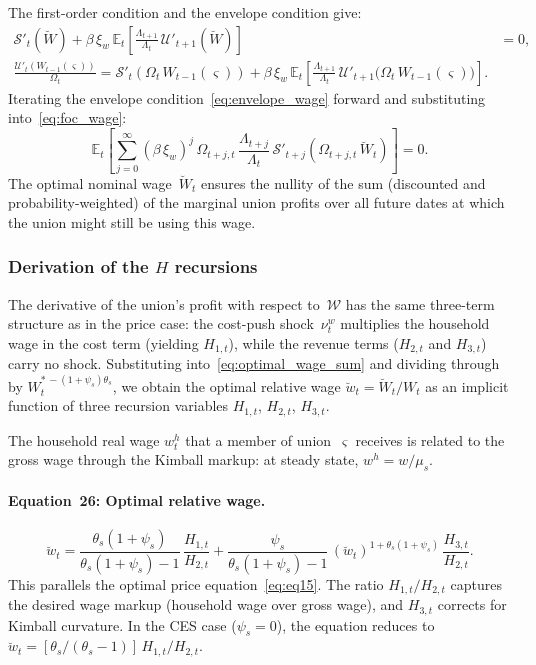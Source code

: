 \documentclass[11pt,a4paper]{article}
\newcommand{\E}{\mathbb{E}}
\begin{document}
The first-order condition and the envelope condition give:
\begin{align}
  \mathscr{S}'_t(\breve W) + \beta\,\xi_w\,\E_t\!\left[
    \frac{\Lambda_{t+1}}{\Lambda_t}\,\mathcal{U}'_{t+1}(\breve W)\right]
  &= 0, \label{eq:foc_wage}\\[4pt]
  \frac{\mathcal{U}'_t(W_{t-1}(\varsigma))}{\Omega_t}
  = \mathscr{S}'_t\!\left(\Omega_t\,W_{t-1}(\varsigma)\right)
  + \beta\,\xi_w\,\E_t\!\left[
    \frac{\Lambda_{t+1}}{\Lambda_t}\,
    \mathcal{U}'_{t+1}\bigl(\Omega_t\,W_{t-1}(\varsigma)\bigr)\right].
    \label{eq:envelope_wage}
\end{align}
Iterating the envelope condition~\eqref{eq:envelope_wage} forward and
substituting into~\eqref{eq:foc_wage}:
\begin{equation}\label{eq:optimal_wage_sum}
  \E_t\!\left[\sum_{j=0}^{\infty}(\beta\,\xi_w)^j\,
  \Omega_{t+j,t}\,\frac{\Lambda_{t+j}}{\Lambda_t}\,
  \mathscr{S}'_{t+j}\!\left(\Omega_{t+j,t}\,\breve W_t\right)\right] = 0.
\end{equation}
The optimal nominal wage~$\breve W_t$ ensures the nullity of the sum
(discounted and probability-weighted) of the marginal union profits over
all future dates at which the union might still be using this wage.

\subsubsection{Derivation of the $H$ recursions}

The derivative of the union's profit with respect to~$\mathcal{W}$ has
the same three-term structure as in the price case: the cost-push
shock~$\nu^w_t$ multiplies the household wage in the cost term (yielding
$H_{1,t}$), while the revenue terms ($H_{2,t}$ and $H_{3,t}$) carry no
shock. Substituting
into~\eqref{eq:optimal_wage_sum} and dividing through by
$W_t^{*\,-(1+\psi_s)\theta_s}$, we obtain the optimal relative
wage $\breve w_t = \breve W_t/W_t$ as an implicit function of three recursion
variables $H_{1,t}$, $H_{2,t}$, $H_{3,t}$.

The household real wage $w^h_t$ that a member of union~$\varsigma$ receives is
related to the gross wage through the Kimball markup: at steady state,
$w^h = w/\mu_s$.

\paragraph{Equation~26: Optimal relative wage.}
\begin{equation}\label{eq:eq26}\tag{Eq.~26}
  \boxed{
  \breve w_t = \frac{\theta_s(1+\psi_s)}{\theta_s(1+\psi_s)-1}\,
  \frac{H_{1,t}}{H_{2,t}}
  + \frac{\psi_s}{\theta_s(1+\psi_s)-1}\,
  (\breve w_t)^{1+\theta_s(1+\psi_s)}\,
  \frac{H_{3,t}}{H_{2,t}}.}
\end{equation}
This parallels the optimal price equation~\eqref{eq:eq15}. The ratio
$H_{1,t}/H_{2,t}$ captures the desired wage markup (household wage over
gross wage), and $H_{3,t}$ corrects for Kimball curvature. In the CES
case ($\psi_s = 0$), the equation reduces to
$\breve w_t = [\theta_s/(\theta_s-1)]\,H_{1,t}/H_{2,t}$.
\end{document}
